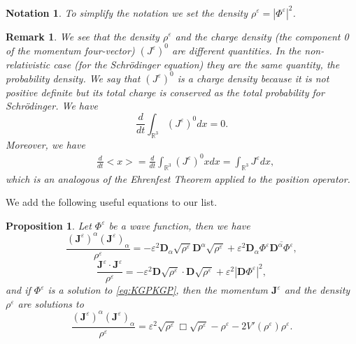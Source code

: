 \documentclass[a4paper, 15pt]{article}
\numberwithin{equation}{section}
\newtheorem{propal}[defi]{Proposition}
\newtheorem{rem}[defi]{Remark}
\newtheorem{nota}[defi]{Notation}
\begin{document}
\begin{nota}
\label{nota:densityKGP}
To simplify the notation we set the density $\rho^\varepsilon=|\Phi^\varepsilon|^2$.\\
\end{nota}
\begin{rem}
\label{rem:chargeKGP}	
We see that the density $\rho^\varepsilon$ and the charge density (the component 0 of the momentum four-vector) $(J^\varepsilon)^0$ are different quantities. In the non-relativistic case (for the Schrödinger equation) they are the same quantity, the probability density. We say that $(J^\varepsilon)^0$ is a charge density because it is not positive definite but its total charge is conserved as the total probability for Schrödinger. We have 
\begin{equation}
\label{eq:conservedchargeKGP}
	\frac{d}{dt}\int_{\mathbb{R}^3}{(J^\varepsilon)^0 dx}=0.
\end{equation}
Moreover, we have  
\begin{align}
	&\frac{d}{dt}<x>=\frac{d}{dt}\int_{\mathbb{R}^3}{(J^\varepsilon)^0 x dx}=\int_{\mathbb{R}^3}{J^\varepsilon  dx},
\end{align}
which is an analogous of the Ehrenfest Theorem applied to the position operator. 
\end{rem}
We add the following useful equations to our list.\\
\begin{propal}
    \label{propal:splitequationKGP}
   Let $\Phi^\varepsilon$ be a wave function, then we have 
    \begin{equation}
       \label{eq:splitJJ1KGP}
       \frac{(\textbf{J}^\varepsilon)^\alpha(\textbf{J}^\varepsilon)_\alpha}{\rho^\varepsilon}=-\varepsilon^2\textbf{D}_\alpha\sqrt{\rho^\varepsilon}\textbf{D}^\alpha\sqrt{\rho^\varepsilon}+\varepsilon^2\textbf{D}_\alpha\Phi^\varepsilon\overline{\textbf{D}^\alpha\Phi^\varepsilon},
    \end{equation}
     \begin{equation}
         \label{eq:splitJJ2KGP}
         \frac{\textbf{J}^\varepsilon\cdot\textbf{J}^\varepsilon}{\rho^\varepsilon}=-\varepsilon^2\textbf{D}\sqrt{\rho^\varepsilon}\cdot\textbf{D}\sqrt{\rho^\varepsilon}+\varepsilon^2|\textbf{D}\Phi^\varepsilon|^2,
    \end{equation}
   and if $\Phi^\varepsilon$ is a solution to \eqref{eq:KGPKGP}, then the momentum $\textbf{J}^\varepsilon$ and the density $\rho^\varepsilon$ are solutions to
    \begin{equation}
         \label{eq:splitJJ3KGP}
         \frac{(\textbf{J}^\varepsilon)^\alpha(\textbf{J}^\varepsilon)_\alpha}{\rho^\varepsilon}=\varepsilon^2\sqrt{\rho^\varepsilon}\Box\sqrt{\rho^\varepsilon}-\rho^\varepsilon-2V'(\rho^\varepsilon)\rho^\varepsilon.
            \end{equation}
\end{propal}
\end{document}
